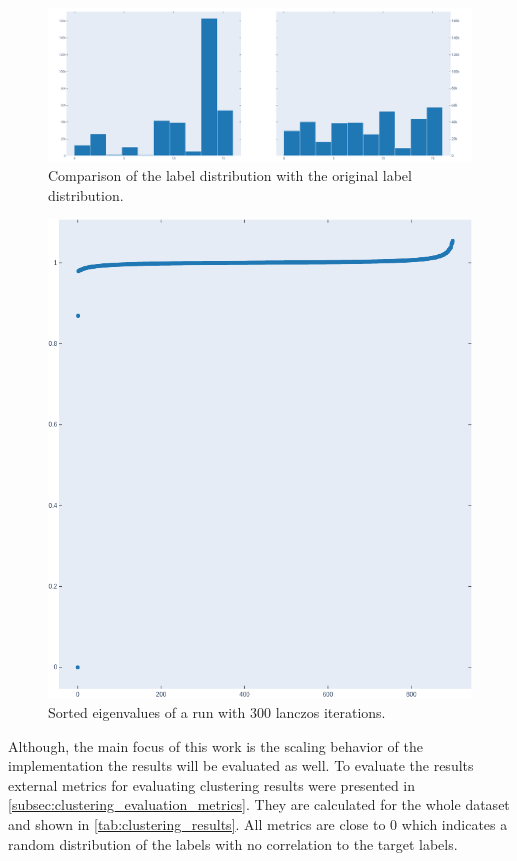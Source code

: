   \begin{figure}
    \centering
    \includegraphics[width=0.9\linewidth]{images/label_distribution.png}
    \caption{Comparison of the label distribution with the original label distribution.}
    \label{fig:label_distribution}
  \end{figure}

  \begin{figure}
    \centering
    \includegraphics[width=0.9\linewidth]{images/eigenvalues.png}
    \caption{Sorted eigenvalues of a run with 300 lanczos iterations.}
    \label{fig:eigenvalues}
  \end{figure}



Although, the main focus of this work is the scaling behavior of the implementation the results will be evaluated as
well. To evaluate the results external metrics for evaluating clustering results were presented in \cref{subsec:clustering_evaluation_metrics}.
They are calculated for the whole dataset and shown in \cref{tab:clustering_results}.
All metrics are close to \(0\) which indicates a random distribution of the labels with no correlation to the target
labels.

